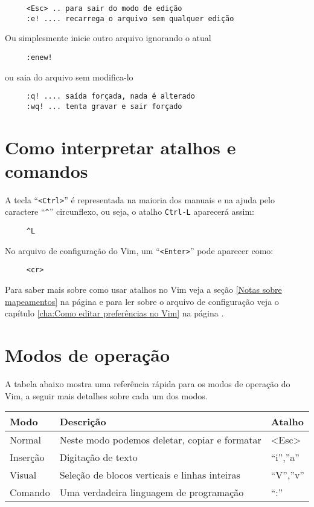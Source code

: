 \begin{verbatim}
     <Esc> .. para sair do modo de edição
     :e! .... recarrega o arquivo sem qualquer edição
\end{verbatim}

Ou simplesmente inicie outro arquivo ignorando o atual

\begin{verbatim}
     :enew!
\end{verbatim}

ou saia do arquivo sem modifica-lo

\begin{verbatim}
     :q! .... saída forçada, nada é alterado
     :wq! ... tenta gravar e sair forçado
\end{verbatim}

\section{Como interpretar atalhos e comandos}\label{Como interpretar atalhos e comandos}

A tecla ``\verb|<Ctrl>|'' é representada na maioria dos manuais e na ajuda
pelo caractere ``\verb|^|'' circunflexo, ou seja, o atalho \verb|Ctrl-L| aparecerá assim:

\begin{verbatim}
     ^L
\end{verbatim}

No arquivo de configuração do Vim, um ``\verb|<Enter>|'' pode aparecer como:

\begin{verbatim}
     <cr>
\end{verbatim}

Para saber mais sobre como usar atalhos no Vim veja a seção \ref{Notas sobre
mapeamentos} na página \pageref{Notas sobre mapeamentos} e para ler sobre o
arquivo de configuração veja o capítulo \ref{cha:Como editar preferências no Vim} na página
\pageref{cha:Como editar preferências no Vim}.


\section{Modos de operação}\label{Modos de operação}

A tabela abaixo mostra uma referência rápida para os modos de operação do Vim,
a seguir mais detalhes sobre cada um dos modos.


\begin{tabular}{|l|l|l|}
\hline
Modo & Descrição & Atalho \tabularnewline
\hline \hline
Normal & Neste modo podemos deletar, copiar e formatar & <Esc>\tabularnewline
\hline
Inserção & Digitação de texto & {}``i'',''a''\tabularnewline
\hline
Visual & Seleção de blocos verticais e linhas inteiras & {}``V'',''v''\tabularnewline
\hline
Comando & Uma verdadeira linguagem de programação & {}``:''\tabularnewline
\hline
\end{tabular}



